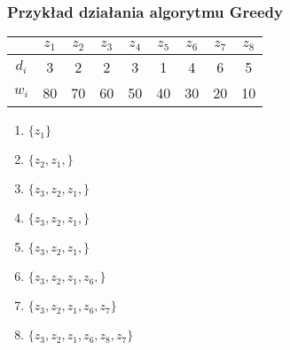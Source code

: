\subsubsection{Przykład działania algorytmu Greedy}
\begin{center}
\begin{tabular}{ c | c | c | c | c | c | c | c | c } 
  	 	& $z_1$	& $z_2$ & $z_3$ & $z_4$	& $z_5$	& $z_6$ & $z_7$ & $z_8$	\\ \hline
  $d_i$	& 3		& 2		& 2		& 3		& 1		& 4		& 6		& 5		\\ \hline
  $w_i$	& 80	& 70	& 60	& 50	& 40	& 30	& 20	& 10	\\ 
\end{tabular}
\end{center}
\begin{enumerate}
	\item $\{ z_1 \}$
	\item $\{ z_2, z_1, \}$
	\item $\{ z_3, z_2, z_1, \}$
	\item $\{ z_3, z_2, z_1, \}$
	\item $\{ z_3, z_2, z_1, \}$
	\item $\{ z_3, z_2, z_1, z_6, \}$
	\item $\{ z_3, z_2, z_1, z_6, z_7 \}$
	\item $\{ z_3, z_2, z_1, z_6, z_8, z_7 \}$
\end{enumerate}

